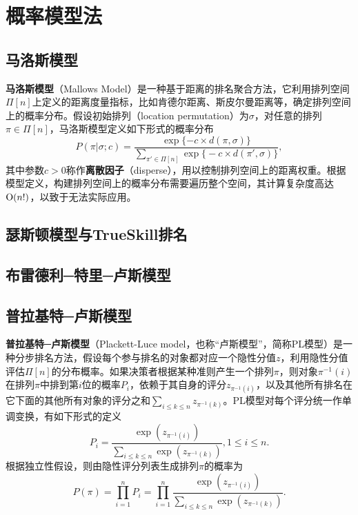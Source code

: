 \section{概率模型法}
\subsection{马洛斯模型}
\textbf{马洛斯模型}（Mallows Model）是一种基于距离的排名聚合方法，它利用排列空间$\Pi[n]$上定义的距离度量指标，比如肯德尔距离、斯皮尔曼距离等，确定排列空间上的概率分布。假设初始排列（location permutation）为$\sigma$，对任意的排列$\pi\in \Pi[n]$，马洛斯模型定义如下形式的概率分布
\begin{equation}\label{eq:mallowsmodel}%
    P(\pi|\sigma; c) = \frac{\exp\{-c\times d(\pi, \sigma)\}}{\sum\limits_{\pi' \in \Pi[n]} \exp\big\{-c \times d(\pi', \sigma)\big\}},
\end{equation}
其中参数$c>0$称作\textbf{离散因子}（disperse），用以控制排列空间上的距离权重。根据模型定义，构建排列空间上的概率分布需要遍历整个空间，其计算复杂度高达$\operatorname{\mathrm{O}}(n!)$，以致于无法实际应用。

\subsection{瑟斯顿模型与TrueSkill排名}%

\subsection{布雷德利─特里─卢斯模型}%

\subsection{普拉基特─卢斯模型}
\textbf{普拉基特─卢斯模型}（Plackett-Luce model，也称“卢斯模型”，简称PL模型）是一种分步排名方法，假设每个参与排名的对象都对应一个隐性分值$z$，利用隐性分值评估$\Pi[n]$的分布概率。如果决策者根据某种准则产生一个排列$\pi$，则对象$\pi^{-1}(i)$在排列$\pi$中排到第$i$位的概率$P_i$，依赖于其自身的评分$z_{\pi^{-1}(i)}$，以及其他所有排名在它下面的其他所有对象的评分之和$\sum\limits_{i\le k\le n} z_{\pi^{-1}(k)}$。PL模型对每个评分统一作单调变换，有如下形式的定义
\[
    P_i = \frac{\exp(z_{\pi^{-1}(i)})}{\sum\limits_{i\le k\le n} \exp(z_{\pi^{-1}(k)})}, 1\le i \le n.
\]
根据独立性假设，则由隐性评分列表生成排列$\pi$的概率为
\begin{equation}\label{eq:luce}
    P(\pi) = \prod\limits_{i=1}^n P_i = \prod\limits_{i=1}^n\frac{\exp(z_{\pi^{-1}(i)})}{\sum\limits_{i\le k\le n} \exp(z_{\pi^{-1}(k)})}.
\end{equation}

